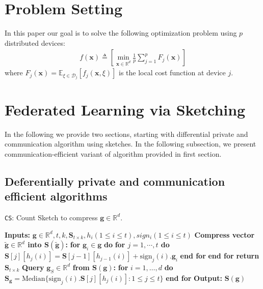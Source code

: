 
\section{Problem Setting}
In this paper our goal is to solve the following optimization problem using $p$ distributed devices:
\begin{align}
    f(\boldsymbol{x})\triangleq \left[\min_{\boldsymbol{x}\in \mathbb{R}^{d}}\frac{1}{p}\sum_{j=1}^{p}F_j(\boldsymbol{x})\right]
\end{align}
where $F_j(\boldsymbol{x})=\mathbb{E}_{\xi\in\mathcal{D}_j}\left[f_j\left(\boldsymbol{x},\xi\right)\right]$ is the local cost function at device $j$.

\section{Federated Learning via Sketching}
In the following we provide two sections, starting with differential private and communication algorithm using sketches. In the following subsection, we present communication-efficient variant of algorithm provided in first section.

\subsection{Deferentially private and communication efficient algorithms}


\begin{algorithm}[H]
\caption{\texttt{CS}: Count Sketch to compress ${\mathbf{g}}\in\mathbb{R}^{d}$. }\label{Alg:csketch}
\begin{algorithmic}[1]
\State \textbf{Inputs:} ${\mathbf{g}}\in\mathbb{R}^{d}, t, k, \mathbf{S}_{t\times k}, h_i (1\leq i\leq t), sign_i (1\leq i\leq t)$
\State \textbf{Compress vector $\tilde{\mathbf{g}}\in\mathbb{R}^{d}$ into $\mathbf{S}\left(\tilde{\mathbf{g}}\right)$:}
\State \textbf{for} $\mathbf{g}_i\in\mathbf{g}$ \textbf{do}
\State \quad\textbf{for $j=1,\cdots,t$ do}
\State \quad\quad $\mathbf{S}[j][h_j(i)]=\mathbf{S}[j-1][h_{j-1}(i)]+\text{sign}_j(i).\mathbf{g}_i$ 
\State \quad\textbf{end for}
\State \textbf{end for}
\State \textbf{return} $\mathbf{S}_{t\times k}$
\State \textbf{Query} $\mathbf{g}_S\in\mathbb{R}^d$ \textbf{from $\mathbf{S(g)}$:}
\State \textbf{for} $i=1,\ldots,d$ \textbf{do}
\State \quad\quad $\mathbf{S}_\mathbf{g}=\text{Median}\{\text{sign}_j(i).\mathbf{S}[j][h_j(i)]:1\leq j\leq t\}$ 
\State \textbf{end for}
\State \textbf{Output:} $\mathbf{S}\left(\mathbf{g}\right)$
\vspace{- 0.1cm}
\end{algorithmic}
\end{algorithm}




